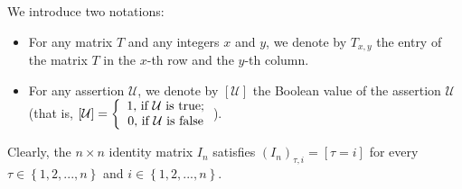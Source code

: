 \documentclass[12pt,final,notitlepage,onecolumn]{article}%
\begin{document}
We introduce two notations:

\begin{itemize}
\item For any matrix $T$ and any integers $x$ and $y$, we denote by $T_{x,y}$
the entry of the matrix $T$ in the $x$-th row and the $y$-th column.

\item For any assertion $\mathcal{U}$, we denote by $\left[  \mathcal{U}%
\right]  $ the Boolean value of the assertion $\mathcal{U}$ (that is, $\left[
\mathcal{U}\right]  =\left\{
\begin{array}
[c]{c}%
1\text{, if }\mathcal{U}\text{ is true;}\\
0\text{, if }\mathcal{U}\text{ is false}%
\end{array}
\right.  $).
\end{itemize}

Clearly, the $n\times n$ identity matrix $I_{n}$ satisfies $\left(
I_{n}\right)  _{\tau,i}=\left[  \tau=i\right]  $ for every $\tau\in\left\{
1,2,...,n\right\}  $ and $i\in\left\{  1,2,...,n\right\}  $.
\end{document}
